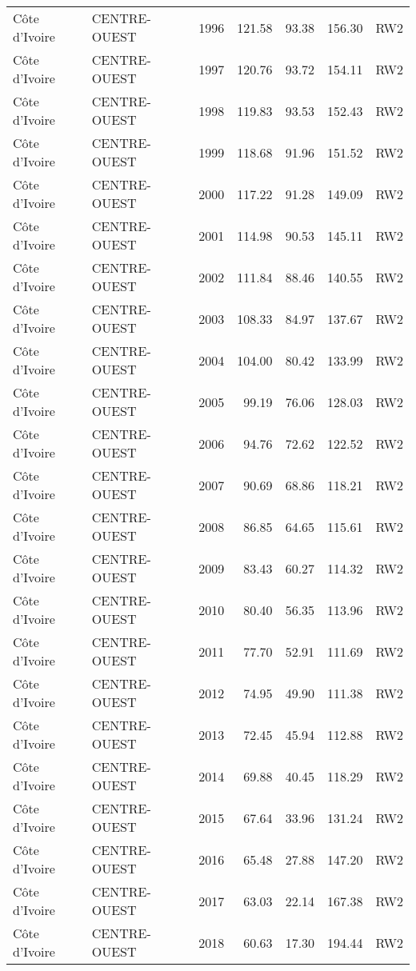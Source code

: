 \begin{longtable}{lllrrrl}
  C\^{o}te d'Ivoire & CENTRE-OUEST & 1996 & 121.58 & 93.38 & 156.30 & RW2 \\ 
  C\^{o}te d'Ivoire & CENTRE-OUEST & 1997 & 120.76 & 93.72 & 154.11 & RW2 \\ 
  C\^{o}te d'Ivoire & CENTRE-OUEST & 1998 & 119.83 & 93.53 & 152.43 & RW2 \\ 
  C\^{o}te d'Ivoire & CENTRE-OUEST & 1999 & 118.68 & 91.96 & 151.52 & RW2 \\ 
  C\^{o}te d'Ivoire & CENTRE-OUEST & 2000 & 117.22 & 91.28 & 149.09 & RW2 \\ 
  C\^{o}te d'Ivoire & CENTRE-OUEST & 2001 & 114.98 & 90.53 & 145.11 & RW2 \\ 
  C\^{o}te d'Ivoire & CENTRE-OUEST & 2002 & 111.84 & 88.46 & 140.55 & RW2 \\ 
  C\^{o}te d'Ivoire & CENTRE-OUEST & 2003 & 108.33 & 84.97 & 137.67 & RW2 \\ 
  C\^{o}te d'Ivoire & CENTRE-OUEST & 2004 & 104.00 & 80.42 & 133.99 & RW2 \\ 
  C\^{o}te d'Ivoire & CENTRE-OUEST & 2005 & 99.19 & 76.06 & 128.03 & RW2 \\ 
  C\^{o}te d'Ivoire & CENTRE-OUEST & 2006 & 94.76 & 72.62 & 122.52 & RW2 \\ 
  C\^{o}te d'Ivoire & CENTRE-OUEST & 2007 & 90.69 & 68.86 & 118.21 & RW2 \\ 
  C\^{o}te d'Ivoire & CENTRE-OUEST & 2008 & 86.85 & 64.65 & 115.61 & RW2 \\ 
  C\^{o}te d'Ivoire & CENTRE-OUEST & 2009 & 83.43 & 60.27 & 114.32 & RW2 \\ 
  C\^{o}te d'Ivoire & CENTRE-OUEST & 2010 & 80.40 & 56.35 & 113.96 & RW2 \\ 
  C\^{o}te d'Ivoire & CENTRE-OUEST & 2011 & 77.70 & 52.91 & 111.69 & RW2 \\ 
  C\^{o}te d'Ivoire & CENTRE-OUEST & 2012 & 74.95 & 49.90 & 111.38 & RW2 \\ 
  C\^{o}te d'Ivoire & CENTRE-OUEST & 2013 & 72.45 & 45.94 & 112.88 & RW2 \\ 
  C\^{o}te d'Ivoire & CENTRE-OUEST & 2014 & 69.88 & 40.45 & 118.29 & RW2 \\ 
  C\^{o}te d'Ivoire & CENTRE-OUEST & 2015 & 67.64 & 33.96 & 131.24 & RW2 \\ 
  C\^{o}te d'Ivoire & CENTRE-OUEST & 2016 & 65.48 & 27.88 & 147.20 & RW2 \\ 
  C\^{o}te d'Ivoire & CENTRE-OUEST & 2017 & 63.03 & 22.14 & 167.38 & RW2 \\ 
  C\^{o}te d'Ivoire & CENTRE-OUEST & 2018 & 60.63 & 17.30 & 194.44 & RW2 \\ 

\end{longtable}
